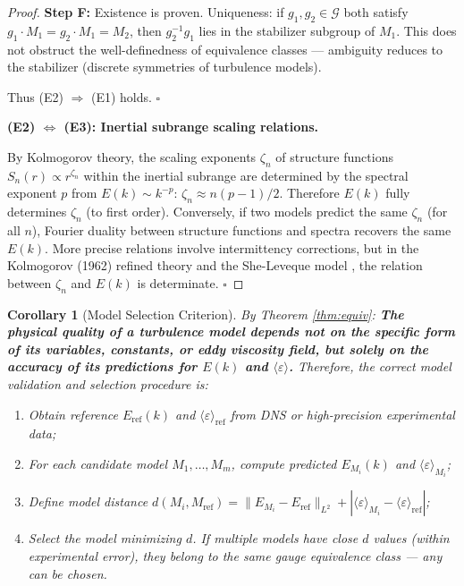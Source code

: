 \documentclass[12pt,a4paper]{article}
\theoremstyle{plain}
\newtheorem{corollary}[theorem]{Corollary}
\theoremstyle{definition}
\theoremstyle{remark}
\newcommand{\G}{\mathcal{G}}
\newcommand{\eps}{\varepsilon}
\newcommand{\avg}[1]{\langle #1 \rangle}
\begin{document}
\begin{proof}
\textbf{Step F:} Existence is proven. Uniqueness: if $g_1,g_2\in\G$ both satisfy $g_1\cdot M_1 = g_2\cdot M_1 = M_2$, then $g_2^{-1}g_1$ lies in the stabilizer subgroup of $M_1$. This does not obstruct the well-definedness of equivalence classes --- ambiguity reduces to the stabilizer (discrete symmetries of turbulence models).

Thus (E2) $\Rightarrow$ (E1) holds. $\square$

\textbf{(E2) $\Leftrightarrow$ (E3): Inertial subrange scaling relations.}

By Kolmogorov theory, the scaling exponents $\zeta_n$ of structure functions $S_n(r) \propto r^{\zeta_n}$ within the inertial subrange are determined by the spectral exponent $p$ from $E(k) \sim k^{-p}$: $\zeta_n \approx n(p-1)/2$. Therefore $E(k)$ fully determines $\zeta_n$ (to first order). Conversely, if two models predict the same $\zeta_n$ (for all $n$), Fourier duality between structure functions and spectra recovers the same $E(k)$. More precise relations involve intermittency corrections, but in the Kolmogorov (1962) refined theory and the She-Leveque model \cite{she1994}, the relation between $\zeta_n$ and $E(k)$ is determinate. $\square$
\end{proof}

\begin{corollary}[Model Selection Criterion]
By Theorem \ref{thm:equiv}: \textbf{The physical quality of a turbulence model depends not on the specific form of its variables, constants, or eddy viscosity field, but solely on the accuracy of its predictions for $E(k)$ and $\avg{\eps}$.} Therefore, the correct model validation and selection procedure is:
\begin{enumerate}[label=\textbf{(S\arabic*)}]
    \item Obtain reference $E_{\text{ref}}(k)$ and $\avg{\eps}_{\text{ref}}$ from DNS or high-precision experimental data;
    \item For each candidate model $M_1,\dots,M_m$, compute predicted $E_{M_i}(k)$ and $\avg{\eps}_{M_i}$;
    \item Define model distance $d(M_i, M_{\text{ref}}) = \|E_{M_i} - E_{\text{ref}}\|_{L^2} + |\avg{\eps}_{M_i} - \avg{\eps}_{\text{ref}}|$;
    \item Select the model minimizing $d$. If multiple models have close $d$ values (within experimental error), they belong to the same gauge equivalence class --- any can be chosen.
\end{enumerate}
\end{corollary}
\end{document}
